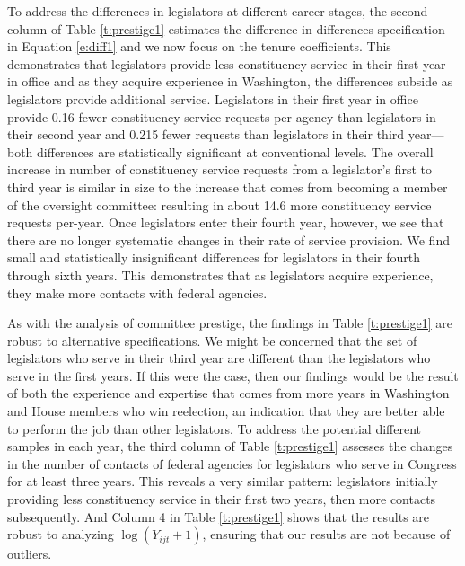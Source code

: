 \documentclass[12pt]{article}
\begin{document}
% 


To address the differences in legislators at different career stages, the second column of Table \ref{t:prestige1} estimates the difference-in-differences specification in Equation \ref{e:diff1} and we now focus on the tenure coefficients.  This demonstrates that legislators provide less constituency service in their first year in office and as they acquire experience in Washington, the differences subside as legislators provide additional service.  Legislators in their first year in office provide 0.16 fewer constituency service requests per agency than legislators in their second year and 0.215 fewer requests than legislators in their third year---both differences are statistically significant at conventional levels.  The overall increase in number of constituency service requests from a legislator's first to third year is similar in size to the increase that comes from becoming a member of the oversight committee: resulting in about 14.6 more constituency service requests per-year.  Once legislators enter their fourth year, however, we see that there are no longer systematic changes in their rate of service provision.  We find small and statistically insignificant differences for legislators in their fourth through sixth years.  This demonstrates that as legislators acquire experience, they make more contacts with federal agencies.  

As with the analysis of committee prestige, the findings in Table \ref{t:prestige1} are robust to alternative specifications.  We might be concerned that the set of legislators who serve in their third year are different than the legislators who serve in the first years.  If this were the case, then our findings would be the result of both the experience and expertise that comes from more years in Washington and House members who win reelection, an indication that they are better able to perform the job than other legislators.  To address the potential different samples in each year, the third column of Table \ref{t:prestige1} assesses the changes in the number of contacts of federal agencies for legislators who serve in Congress for at least three years.  This reveals a very similar pattern: legislators initially providing less constituency service in their first two years, then more contacts subsequently.  And Column 4 in Table \ref{t:prestige1} shows that the results are robust to analyzing $\log(Y_{ijt} + 1)$, ensuring that our results are not because of outliers.  
\end{document}

